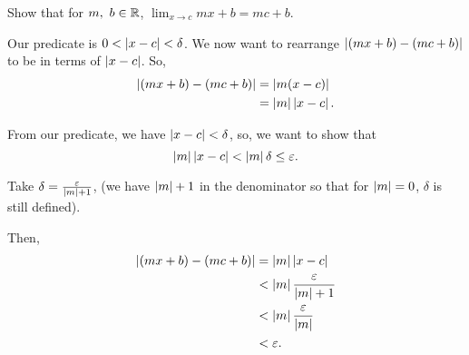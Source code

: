 \documentclass[12pt]{article}
\theoremstyle{definition}
\begin{document}
            \begin{eg}
                Show that for $m, ~b \in \R$, $\lim_{x \rightarrow c} mx + b = mc + b$.

                Our predicate is $0 < \left|x - c\right| < \delta$. We now want to rearrange $\left|(mx + b) - (mc + b)\right|$ to be in terms of $\left|x - c\right|$. So,
                \begin{align*}
                    \left|(mx + b) - (mc + b)\right| &= \left|m(x - c)\right| \\
                                              &= \left|m\right|\left|x - c\right|.
                \end{align*}

                From our predicate, we have $\left|x - c\right| < \delta$, so, we want to show that 
                \begin{equation*}
                    \left|m\right|\left|x - c\right| < \left|m\right|\delta \leq \varepsilon.
                \end{equation*}

                Take $\delta = \frac{\varepsilon}{\left|m\right| + 1}$, (we have $\left|m\right| + 1$ in the denominator so that for $\left|m\right| = 0$, $\delta$ is still defined).

                Then, 
                \begin{align*}
                    \left|(mx + b) - (mc + b)\right| &= \left|m\right|\left|x - c\right| \\
                                              &< \left|m\right| \frac{\varepsilon}{\left|m\right| + 1} \\
                                              &< \left|m\right|\frac{\varepsilon}{\left|m\right|} \\
                                              &< \varepsilon.
                \end{align*}
            \end{eg}
\end{document}
